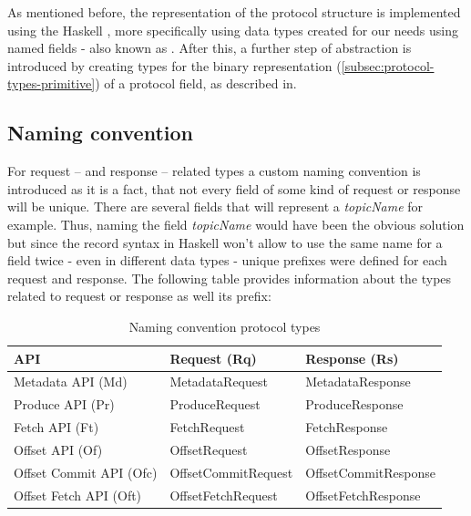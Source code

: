 As mentioned before, the representation of the protocol structure is implemented
using the Haskell , more
specifically using data types created for our needs using named fields - also
known as . After this, a
further step of abstraction is introduced by creating types for the binary
representation (\ref{subsec:protocol-types-primitive}) of a protocol field, as
described in.

\subsection{Naming convention}

For request -- and response -- related types a custom naming convention is introduced
as it is a fact, that not every field of some kind of request or response will
be unique. There are several fields that will represent a
\textit{topicName} for example. Thus, naming the field \textit{topicName} would
have been the obvious solution but since the record syntax in Haskell won't
allow to use the same name for a field twice - even in different data types -
unique prefixes were defined for each request and response. The following table
provides information about the types related to request or response as well its
prefix:

\begin{table}[H]
\centering
\begin{tabular}{|l|l|l|}
\hline
\textbf{API}            & \textbf{Request (Rq)} & \textbf{Response (Rs)} \\ \hline
Metadata API (Md)       & MetadataRequest       & MetadataResponse       \\ \hline
Produce API (Pr)        & ProduceRequest        & ProduceResponse        \\ \hline
Fetch API (Ft)          & FetchRequest          & FetchResponse          \\ \hline
Offset API (Of)         & OffsetRequest         & OffsetResponse         \\ \hline
Offset Commit API (Ofc) & OffsetCommitRequest   & OffsetCommitResponse   \\ \hline
Offset Fetch API (Oft)  & OffsetFetchRequest    & OffsetFetchResponse    \\ \hline
\end{tabular}
\caption{Naming convention protocol types}
\end{table}

